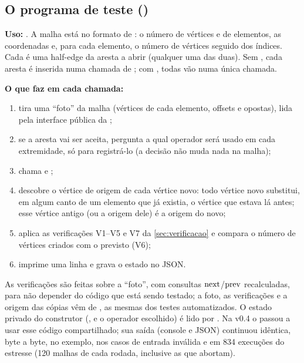 \subsection{O programa de teste ()}

\textbf{Uso:} . A malha está no formato de
: o número de vértices e de elementos, as coordenadas e, para cada elemento, o número de vértices
seguido dos índices. Cada  é uma half-edge da aresta a abrir (qualquer uma das duas). Sem , cada
aresta é inserida numa chamada de ; com , todas vão numa única chamada.

\textbf{O que faz em cada chamada:}
\begin{enumerate}
\item tira uma ``foto'' da malha (vértices de cada elemento, offsets e opostas), lida pela interface pública da
;
\item se a aresta vai ser aceita, pergunta a  qual operador será usado em cada extremidade, só para
registrá-lo (a decisão não muda nada na malha);
\item chama  e ;
\item descobre o vértice de origem de cada vértice novo: todo vértice novo substitui, em algum canto de um elemento que
já existia, o vértice que estava lá antes; esse vértice antigo (ou a origem dele) é a origem do novo;
\item aplica as verificações V1--V5 e V7 da \cref{sec:verificacao} e compara o número de vértices criados com o
previsto (V6);
\item imprime uma linha e grava o estado no JSON.
\end{enumerate}
As verificações são feitas sobre a ``foto'', com consultas $\mathrm{next}$/$\mathrm{prev}$ recalculadas, para não depender do código que
está sendo testado; a foto, as verificações e a origem das cópias vêm de , as mesmas
dos testes automatizados. O estado privado do construtor (,  e o operador
escolhido) é lido por . Na v0.4 o  passou a usar esse código compartilhado; sua saída
(console e JSON) continuou idêntica, byte a byte, no exemplo, nos casos de entrada inválida e em 834 execuções do
estresse (120 malhas de cada rodada, inclusive as que abortam).

